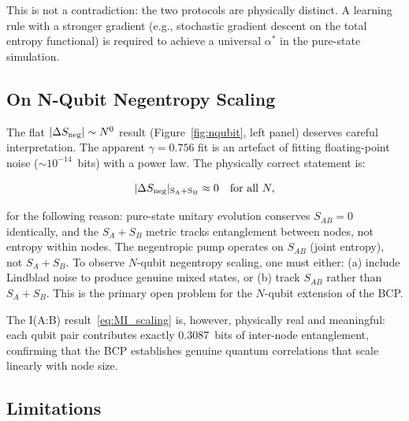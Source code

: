 \documentclass[12pt]{article}
\begin{document}
\noindent
This is not a contradiction: the two protocols are physically distinct.
A learning rule with a stronger gradient (e.g., stochastic gradient descent
on the total entropy functional) is required to achieve a universal
$\alpha^*$ in the pure-state simulation.

\subsection{On N-Qubit Negentropy Scaling}

The flat $|\Delta S_{\rm neg}| \sim N^0$ result (Figure~\ref{fig:nqubit},
left panel) deserves careful interpretation.  The apparent $\gamma=0.756$
fit is an artefact of fitting floating-point noise ($\sim 10^{-14}$~bits)
with a power law.  The physically correct statement is:

\begin{equation}
|\Delta S_{\rm neg}|_{\rm S_A + S_B} \approx 0 \quad \text{for all } N,
\label{eq:flat}
\end{equation}

for the following reason: pure-state unitary evolution conserves
$S_{AB} = 0$ identically, and the $S_A + S_B$ metric tracks entanglement
between nodes, not entropy within nodes.  The negentropic pump operates
on $S_{AB}$ (joint entropy), not $S_A + S_B$.  To observe $N$-qubit
negentropy scaling, one must either: (a) include Lindblad noise to produce
genuine mixed states, or (b) track $S_{AB}$ rather than $S_A + S_B$.
This is the primary open problem for the $N$-qubit extension of the BCP.

The I(A:B) result~\eqref{eq:MI_scaling} is, however, physically real
and meaningful: each qubit pair contributes exactly 0.3087~bits of
inter-node entanglement, confirming that the BCP establishes genuine
quantum correlations that scale linearly with node size.

\subsection{Limitations}
\end{document}
